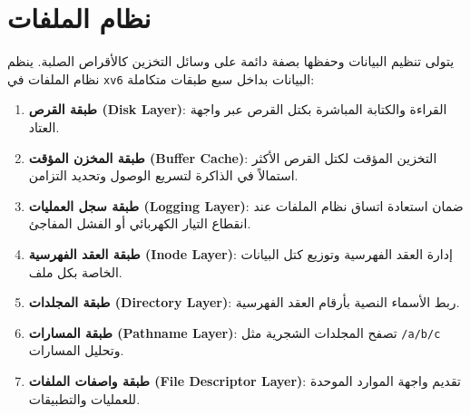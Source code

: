 \chapter{نظام الملفات}
\label{chap:fs}

يتولى  تنظيم البيانات وحفظها بصفة دائمة على وسائل التخزين كالأقراص الصلبة.
ينظم نظام الملفات في \texttt{xv6} البيانات بداخل سبع طبقات متكاملة:
\begin{enumerate}
\item \textbf{طبقة القرص (Disk Layer)}: القراءة والكتابة المباشرة بكتل القرص عبر واجهة العتاد.
\item \textbf{طبقة المخزن المؤقت (Buffer Cache)}: التخزين المؤقت لكتل القرص الأكثر استمالاً في الذاكرة لتسريع الوصول وتحديد التزامن.
\item \textbf{طبقة سجل العمليات (Logging Layer)}: ضمان استعادة اتساق نظام الملفات عند انقطاع التيار الكهربائي أو الفشل المفاجئ.
\item \textbf{طبقة العقد الفهرسية (Inode Layer)}: إدارة العقد الفهرسية وتوزيع كتل البيانات الخاصة بكل ملف.
\item \textbf{طبقة المجلدات (Directory Layer)}: ربط الأسماء النصية بأرقام العقد الفهرسية.
\item \textbf{طبقة المسارات (Pathname Layer)}: تصفح المجلدات الشجرية مثل \texttt{/a/b/c} وتحليل المسارات.
\item \textbf{طبقة واصفات الملفات (File Descriptor Layer)}: تقديم واجهة الموارد الموحدة للعمليات والتطبيقات.
\end{enumerate}
